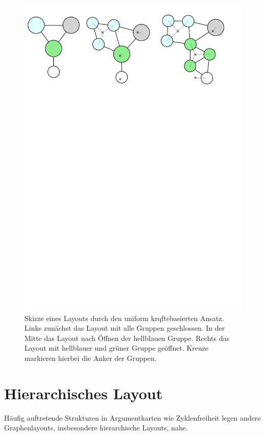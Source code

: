 \begin{figure}[h!]
\begin{center}
	\includegraphics[width=\textwidth]{Pics/uniform_kb.pdf}
	\caption{Skizze eines Layouts durch den uniform krqftebasierten Ansatz. Links zunächst das Layout mit alle Gruppen geschlossen. In der Mitte das Layout nach Öffnen der hellblauen Gruppe. Rechts das Layout mit hellblauer und grüner Gruppe geöffnet. Kreuze markieren hierbei die Anker der Gruppen.}
	\label{UniformK-Skizze}
\end{center}
\end{figure}


\section{Hierarchisches Layout}
\label{Hierarch-Ansatz}
Häufig auftretende Strukturen in Argumentkarten wie Zyklenfreiheit legen andere Graphenlayouts, insbesondere hierarchische Layouts, nahe.

